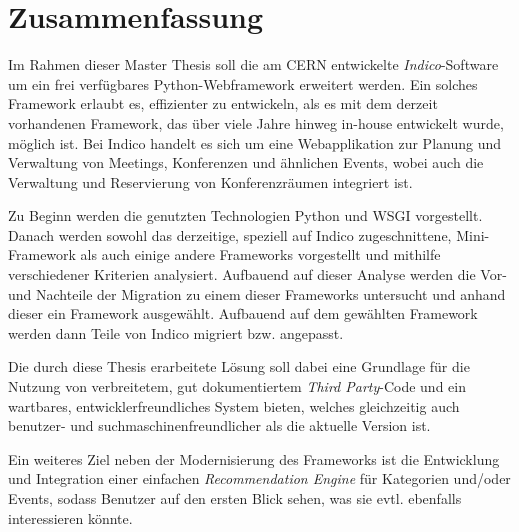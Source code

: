 \chapter*{Zusammenfassung}
\thispagestyle{empty}

Im Rahmen dieser Master Thesis soll die am CERN entwickelte \emph{Indico}-Software um ein frei
verfügbares Python-Webframework erweitert werden. Ein solches Framework erlaubt es, effizienter zu
entwickeln, als es mit dem derzeit vorhandenen Framework, das über viele Jahre hinweg in-house
entwickelt wurde, möglich ist.
Bei Indico handelt es sich um eine Webapplikation zur Planung und Verwaltung von Meetings,
Konferenzen und ähnlichen Events, wobei auch die Verwaltung und Reservierung von Konferenzräumen
integriert ist.

Zu Beginn werden die genutzten Technologien Python und WSGI vorgestellt. Danach werden sowohl
das derzeitige, speziell auf Indico zugeschnittene, Mini-Framework als auch einige andere
Frameworks vorgestellt und mithilfe verschiedener Kriterien analysiert. Aufbauend auf dieser Analyse
werden die Vor- und Nachteile der Migration zu einem dieser Frameworks untersucht und anhand dieser
ein Framework ausgewählt. Aufbauend auf dem gewählten Framework werden dann Teile von Indico
migriert bzw. angepasst.

Die durch diese Thesis erarbeitete Lösung soll dabei eine Grundlage für die Nutzung von
verbreitetem, gut dokumentiertem \emph{Third Party}-Code und ein wartbares, entwicklerfreundliches
System bieten, welches gleichzeitig auch benutzer- und suchmaschinenfreundlicher als die aktuelle
Version ist.

Ein weiteres Ziel neben der Modernisierung des Frameworks ist die Entwicklung und Integration einer
einfachen \emph{Recommendation Engine} für Kategorien und/oder Events, sodass Benutzer auf den
ersten Blick sehen, was sie evtl. ebenfalls interessieren könnte.
